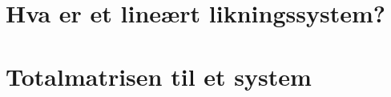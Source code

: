 \begin{ex}

\end{ex}


\section*{Hva er et lineært likningssystem?}



\section*{Totalmatrisen til et system}



